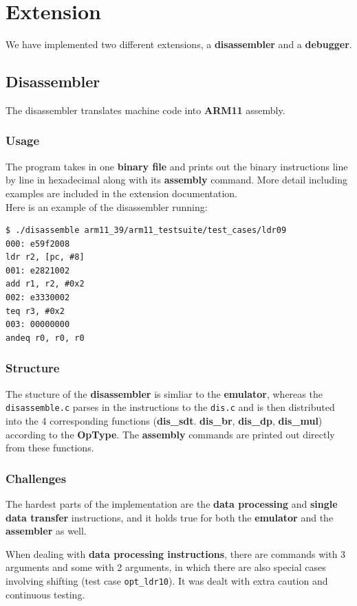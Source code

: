 \documentclass[11pt, a4paper]{article}
\begin{document}
\section{Extension}
We have implemented two different extensions, a \textbf{disassembler} and a \textbf{debugger}.
\subsection{Disassembler}
The disassembler translates machine code into \textbf{ARM11} assembly.
\subsubsection{Usage}
The program takes in one \textbf{binary file} and prints out the binary instructions line by line in hexadecimal along with its \textbf{assembly} command. More detail including examples are included in the extension documentation.\\
Here is an example of the disassembler running:
\begin{verbatim}
$ ./disassemble arm11_39/arm11_testsuite/test_cases/ldr09 
000: e59f2008 
ldr r2, [pc, #8] 
001: e2821002 
add r1, r2, #0x2 
002: e3330002 
teq r3, #0x2 
003: 00000000 
andeq r0, r0, r0 
\end{verbatim}
\subsubsection{Structure}
The stucture of the \textbf{disassembler} is simliar to the \textbf{emulator}, whereas the \texttt{disassemble.c} parses in the instructions to the \texttt{dis.c} and is then distributed into the 4 corresponding functions (\textbf{dis\_sdt}. \textbf{dis\_br}, \textbf{dis\_dp}, \textbf{dis\_mul}) according to the \textbf{OpType}. The \textbf{assembly} commands are printed out directly from these functions.
\subsubsection{Challenges}
The hardest parts of the implementation are the \textbf{data processing} and \textbf{single data transfer} instructions, and it holds true for both the \textbf{emulator} and the \textbf{assembler} as well. 

When dealing with \textbf{data processing instructions}, there are commands with 3 arguments and some with 2 arguments, in which there are also special cases involving shifting (test case \texttt{opt\_ldr10}). It was dealt with extra caution and continuous testing.
\end{document}
